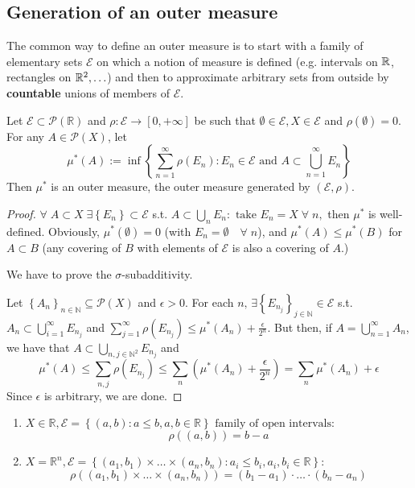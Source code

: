 \subsection{Generation of an outer measure}
The common way to define an outer measure is to start with a family of elementary sets \(\mathcal{E}\) on which a notion of measure is defined (e.g. intervals on \(\mathbb{R}\), rectangles on \(\mathbb{R}^2, \ldots\)) and then to approximate arbitrary sets from outside by \textbf{countable} unions of members of \(\mathcal{E}\).
\begin{proposition}
    Let \(\mathcal{E} \subset \mathcal{P}(\mathbb{R})\) and \(\rho : \mathcal{E} \to [0, +\infty]\) be such that \(\emptyset \in \mathcal{E}, X \in \mathcal{E}\) and \(\rho(\emptyset) = 0\). For any \(A \in \mathcal{P}(X)\), let 
    \[\mu^*(A) := \inf \left\lbrace \sum_{n=1}^{\infty} \rho (E_n) : E_n \in \mathcal{E} \mbox{ and } A \subset \bigcup_{n=1}^{\infty} E_n \right\rbrace\]
    Then \(\mu^*\) is an outer measure, the outer measure generated by \((\mathcal{E}, \rho)\).
\end{proposition}
\begin{proof}
    \(\forall \; A \subset X \; \exists \left\lbrace E_n \right\rbrace \subset \mathcal{E}\) s.t. \(A \subset \bigcup_n E_n : \mbox{ take } E_n = X \; \forall \; n,\)
    then \(\mu^*\) is well-defined. Obviously, \(\mu^*(\emptyset) = 0\) (with \(E_n = \emptyset \quad \forall\; n\)), and \(\mu^*(A) \leq \mu^*(B)\) for \(A \subset B\) (any covering of \(B\) with elements of \(\mathcal{E}\) is also a covering of \(A\).)

    We have to prove the \(\sigma\)-subadditivity. 
    
    \noindent Let \(\left\lbrace A_n \right\rbrace_{n \in \mathbb{N}} \subseteq \mathcal{P}(X)\) and \(\epsilon > 0\). For each \(n, \, \exists \left\lbrace E_{n_j} \right\rbrace_{j \in \mathbb{N}} \in \mathcal{E}\) s.t. \(A_n \subset \bigcup_{i = 1}^{\infty} E_{n_j}\) and \(\sum_{j=1}^{\infty} \rho(E_{n_j}) \leq \mu^*(A_n) + \frac{\epsilon}{2^n}\).  
    But then, if \(A = \bigcup_{n=1}^{\infty} A_n\), we have that \(A \subset \bigcup_{n,j \in \mathbb{N}^2} E_{n_j}\) and
    \[
        \mu^*(A) \leq \sum_{n,j} \rho(E_{n_j}) \leq \sum_{n} \left(\mu^*(A_n) + \frac{\epsilon}{2^n}\right) = \sum_{n} \mu^*(A_n) + \epsilon
    \]
    Since \(\epsilon\) is arbitrary, we are done.
\end{proof}
\begin{example}
    \begin{enumerate}
        \item \(X \in \mathbb{R}, \mathcal{E} = \left\lbrace (a,b) : a \leq b, a,b \in \mathbb{R} \right\rbrace \mbox{ family of open intervals:} \)
        \[
            \rho((a,b)) = b-a
        \]
        
        \item \(X = \mathbb{R}^n, \mathcal{E} = \left\lbrace (a_1, b_1) \times \ldots \times (a_n, b_n) : a_i \leq b_i, a_i, b_i \in \mathbb{R} \right\rbrace\): 
        \[
            \rho((a_1, b_1)\times \ldots \times (a_n, b_n)) = (b_1 -a_1) \cdot \ldots \cdot (b_n - a_n)
        \]
    \end{enumerate}
\end{example}
